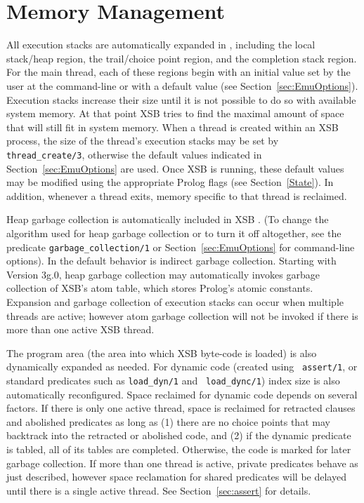 \section{Memory Management}\label{memory_management}
 
All execution stacks are automatically expanded in \version{},
including the local stack/heap region, the trail/choice point region,
and the completion stack region.  For the main thread, each of these
regions begin with an initial value set by the user at the
command-line or with a default value (see
Section~\ref{sec:EmuOptions}).  Execution stacks increase their size
until it is not possible to do so with available system memory.  At
that point XSB tries to find the maximal amount of space that will
still fit in system memory.  When a thread is created within an XSB
process, the size of the thread's execution stacks may be set by {\tt
  thread\_create/3}, otherwise the default values indicated in
Section~\ref{sec:EmuOptions} are used.  Once XSB is running, these
default values may be modified using the appropriate Prolog flags (see
Section~\ref{State}).  In addition, whenever a thread exits, memory
specific to that thread is reclaimed.

Heap garbage collection is automatically included in XSB
\cite{CaSC01,CATmem@ISMM-98}.  (To change the algorithm used for heap
garbage collection or to turn it off altogether, see the predicate
{\tt garbage\_collection/1} or Section~\ref{sec:EmuOptions} for
command-line options).  In \version{} the default behavior is indirect
garbage collection.  Starting with Version 3g.0, heap garbage collection
may automatically invokes garbage collection of XSB's atom table,
which stores Prolog's atomic constants.  Expansion and garbage
collection of execution stacks can occur when multiple threads are
active; however atom garbage collection will not be invoked if there
is more than one active XSB thread.

The program area (the area into which XSB byte-code is loaded) is also
dynamically expanded as needed.  For dynamic code (created using {\tt
  assert/1}, or standard predicates such as {\tt load\_dyn/1} and {\tt
  load\_dync/1}) index size is also automatically reconfigured.  Space
reclaimed for dynamic code depends on several factors.  If there is
only one active thread, space is reclaimed for retracted clauses and
abolished predicates as long as (1) there are no choice points that
may backtrack into the retracted or abolished code, and (2) if the
dynamic predicate is tabled, all of its tables are completed.
Otherwise, the code is marked for later garbage collection.  If more
than one thread is active, private predicates behave as just
described, however space reclamation for shared predicates will be
delayed until there is a single active thread.  See
Section~\ref{sec:assert} for details.

